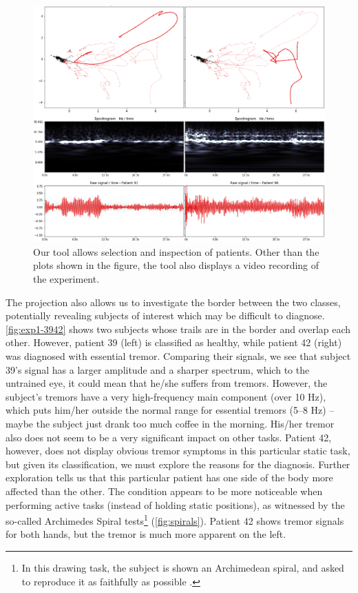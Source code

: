 \begin{figure}[ht]
\centering
\includegraphics[width=\linewidth]{figures/nemo/exp1-9196.png}
\caption{Our tool allows selection and inspection of patients. Other than the plots shown in the figure, the tool also displays a video recording of the experiment.}
\label{fig:exp1-9196}
\end{figure}

The projection also allows us to investigate the border between the two classes, potentially revealing subjects of interest which may be difficult to diagnose.
\cref{fig:exp1-3942} shows two subjects whose trails are in the border and overlap each other. However, patient 39 (left) is classified as healthy, while patient 42 (right) was diagnosed with essential tremor. Comparing their signals, we see that subject 39's signal has a larger amplitude and a sharper spectrum, which to the untrained eye, it could mean that he/she suffers from tremors. However, the subject's tremors have a very high-frequency main component (over 10 Hz), which puts him/her outside the normal range for essential tremors (5--8 Hz) -- maybe the subject just drank too much coffee in the morning. His/her tremor also does not seem to be a very significant impact on other tasks. Patient 42, however, does not display obvious tremor symptoms in this particular static task, but given its classification, we must explore the reasons for the diagnosis.
Further exploration tells us that this particular patient has one side of the body more affected than the other. The condition appears to be more noticeable when performing active tasks (instead of holding static positions), as witnessed by the so-called Archimedes Spiral tests\footnote{In this drawing task, the subject is shown an Archimedean spiral, and asked to reproduce it as faithfully as possible \citep{bain}.} (\cref{fig:spirals}). Patient 42 shows tremor signals for both hands, but the tremor is much more apparent on the left.

